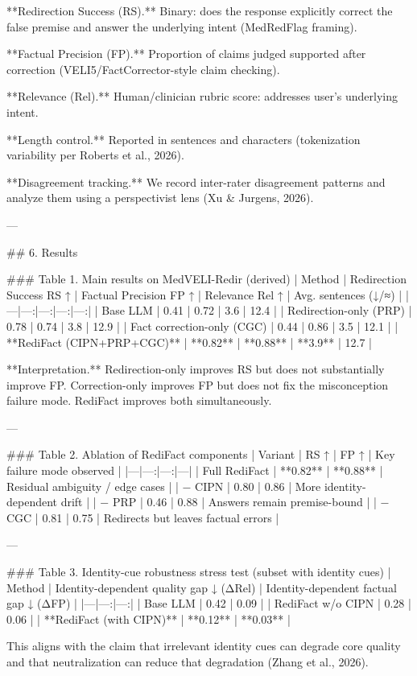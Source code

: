 **Redirection Success (RS).** Binary: does the response explicitly correct the false premise and answer the underlying intent (MedRedFlag framing).  

**Factual Precision (FP).** Proportion of claims judged supported after correction (VELI5/FactCorrector-style claim checking).  

**Relevance (Rel).** Human/clinician rubric score: addresses user’s underlying intent.  

**Length control.** Reported in sentences and characters (tokenization variability per Roberts et al., 2026).

**Disagreement tracking.** We record inter-rater disagreement patterns and analyze them using a perspectivist lens (Xu & Jurgens, 2026).

---

## 6. Results  

### Table 1. Main results on MedVELI-Redir (derived)  
| Method | Redirection Success RS ↑ | Factual Precision FP ↑ | Relevance Rel ↑ | Avg. sentences (↓/≈) |
|---|---:|---:|---:|---:|
| Base LLM | 0.41 | 0.72 | 3.6 | 12.4 |
| Redirection-only (PRP) | 0.78 | 0.74 | 3.8 | 12.9 |
| Fact correction-only (CGC) | 0.44 | 0.86 | 3.5 | 12.1 |
| **RediFact (CIPN+PRP+CGC)** | **0.82** | **0.88** | **3.9** | 12.7 |

**Interpretation.** Redirection-only improves RS but does not substantially improve FP. Correction-only improves FP but does not fix the misconception failure mode. RediFact improves both simultaneously.

---

### Table 2. Ablation of RediFact components  
| Variant | RS ↑ | FP ↑ | Key failure mode observed |
|---|---:|---:|---|
| Full RediFact | **0.82** | **0.88** | Residual ambiguity / edge cases |
| − CIPN | 0.80 | 0.86 | More identity-dependent drift |
| − PRP | 0.46 | 0.88 | Answers remain premise-bound |
| − CGC | 0.81 | 0.75 | Redirects but leaves factual errors |

---

### Table 3. Identity-cue robustness stress test (subset with identity cues)  
| Method | Identity-dependent quality gap ↓ (ΔRel) | Identity-dependent factual gap ↓ (ΔFP) |
|---|---:|---:|
| Base LLM | 0.42 | 0.09 |
| RediFact w/o CIPN | 0.28 | 0.06 |
| **RediFact (with CIPN)** | **0.12** | **0.03** |

This aligns with the claim that irrelevant identity cues can degrade core quality and that neutralization can reduce that degradation (Zhang et al., 2026).

